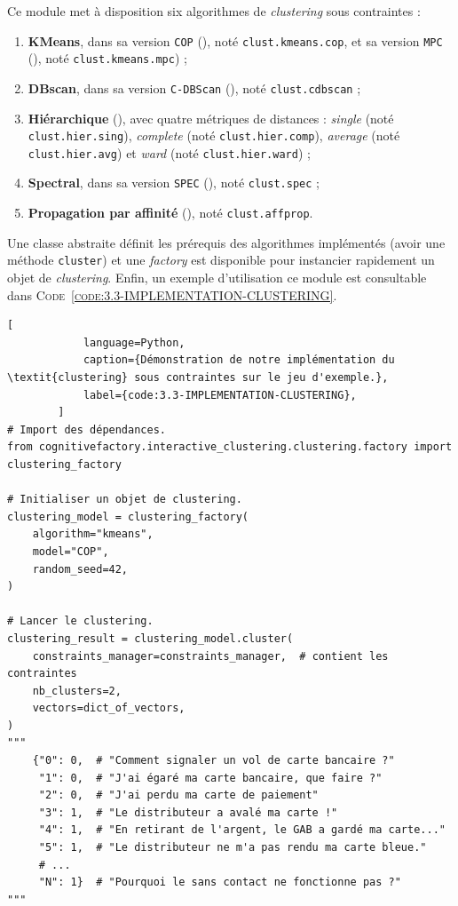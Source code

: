 		Ce module met à disposition six algorithmes de \textit{clustering} sous contraintes :
		\begin{enumerate}
			\item \textbf{KMeans}, dans sa version \texttt{COP} (\cite{wagstaff-etal:2001:constrained-kmeans-clustering}), noté \texttt{clust.kmeans.cop}, et sa version \texttt{MPC} (\cite{khan-etal:2012:multiple-parameter-based}), noté \texttt{clust.kmeans.mpc}) ;
			\item \textbf{DBscan}, dans sa version \texttt{C-DBScan} (\cite{ruiz-etal:2010:densitybased-semisupervised-clustering}), noté \texttt{clust.cdbscan} ;
			\item \textbf{Hiérarchique} (\cite{davidson-ravi:2005:agglomerative-hierarchical-clustering}), avec quatre métriques de distances : \textit{single} (noté \texttt{clust.hier.sing}), \textit{complete} (noté \texttt{clust.hier.comp}), \textit{average} (noté \texttt{clust.hier.avg}) et \textit{ward} (noté \texttt{clust.hier.ward}) ;
			\item \textbf{Spectral}, dans sa version \texttt{SPEC} (\cite{kamvar-etal:2003:spectral-learning}), noté \texttt{clust.spec} ;
			\item \textbf{Propagation par affinité} (\cite{givoni-frey:2009:semisupervised-affinity-propagation}), noté \texttt{clust.affprop}.
		\end{enumerate}
		
		Une classe abstraite définit les prérequis des algorithmes implémentés (avoir une méthode \texttt{cluster}) et une \textit{factory} est disponible pour instancier rapidement un objet de \textit{clustering}.
		Enfin, un exemple d'utilisation ce module est consultable dans \textsc{Code~\ref{code:3.3-IMPLEMENTATION-CLUSTERING}}.
		
		
		\begin{lstlisting}[
			language=Python,
			caption={Démonstration de notre implémentation du \textit{clustering} sous contraintes sur le jeu d'exemple.},
			label={code:3.3-IMPLEMENTATION-CLUSTERING},
		]
# Import des dépendances.
from cognitivefactory.interactive_clustering.clustering.factory import clustering_factory

# Initialiser un objet de clustering.
clustering_model = clustering_factory(
	algorithm="kmeans",
	model="COP",
	random_seed=42,
)

# Lancer le clustering.
clustering_result = clustering_model.cluster(
	constraints_manager=constraints_manager,  # contient les contraintes
	nb_clusters=2,
	vectors=dict_of_vectors,
)
"""
	{"0": 0,  # "Comment signaler un vol de carte bancaire ?"
	 "1": 0,  # "J'ai égaré ma carte bancaire, que faire ?"
	 "2": 0,  # "J'ai perdu ma carte de paiement"
	 "3": 1,  # "Le distributeur a avalé ma carte !"
	 "4": 1,  # "En retirant de l'argent, le GAB a gardé ma carte..."
	 "5": 1,  # "Le distributeur ne m'a pas rendu ma carte bleue."
	 # ...
	 "N": 1}  # "Pourquoi le sans contact ne fonctionne pas ?"
"""
		\end{lstlisting}
		

